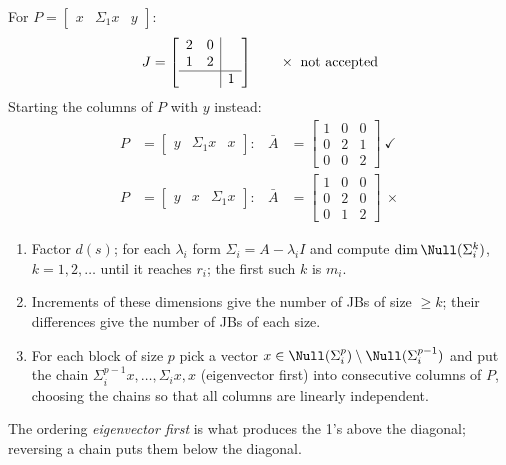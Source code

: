 \begin{example}
For $P=\left[\begin{array}{cc|c}x&\Sigma_1x&y\end{array}\right]$:
\[
J=\left[\begin{array}{cc|c}2&0&\\1&2&\\\hline &&1\end{array}\right]
\qquad \times\ \text{not accepted}
\]
Starting the columns of $P$ with $y$ instead:
\begin{align*}
P&=\left[\begin{array}{c|cc}y&\Sigma_1x&x\end{array}\right]: &
\bar A&=\left[\begin{array}{c|cc}1&0&0\\\hline 0&2&1\\0&0&2\end{array}\right]\ \checkmark\\[4pt]
P&=\left[\begin{array}{c|cc}y&x&\Sigma_1x\end{array}\right]: &
\bar A&=\left[\begin{array}{c|cc}1&0&0\\\hline 0&2&0\\0&1&2\end{array}\right]\ \times
\end{align*}

\begin{insight}
\begin{enumerate}[nosep]
\item Factor $d(s)$; for each $\lambda_i$ form $\Sigma_i=A-\lambda_iI$ and compute $\dim\Null(\Sigma_i^k)$, $k=1,2,\dots$ until it reaches $r_i$; the first such $k$ is $m_i$.
\item Increments of these dimensions give the number of JBs of size $\geq k$; their differences give the number of JBs of each size.
\item For each block of size $p$ pick a vector $x\in\Null(\Sigma_i^{p})\setminus\Null(\Sigma_i^{p-1})$ and put the chain $\Sigma_i^{p-1}x,\dots,\Sigma_ix,x$ (eigenvector first) into consecutive columns of $P$, choosing the chains so that all columns are linearly independent.
\end{enumerate}
The ordering \emph{eigenvector first} is what produces the 1's above the diagonal; reversing a chain puts them below the diagonal.
\end{insight}
\end{example}

